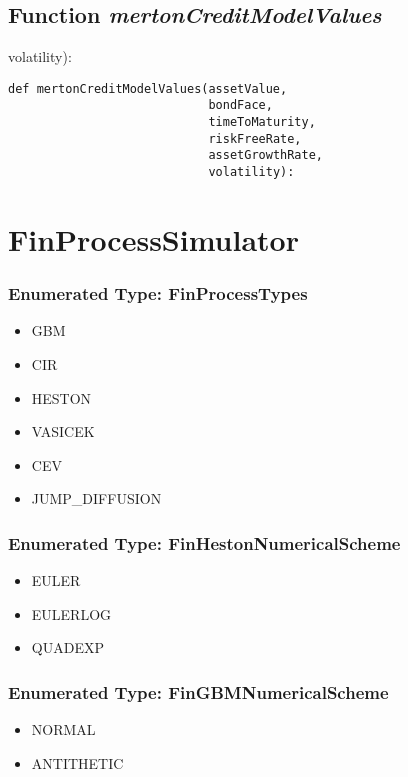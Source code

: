 \documentclass[twoside,11pt]{book}
\begin{document}
\subsection{Function {\it mertonCreditModelValues}}
volatility):

\begin{lstlisting}
def mertonCreditModelValues(assetValue,
                            bondFace,
                            timeToMaturity,
                            riskFreeRate,
                            assetGrowthRate,
                            volatility):
\end{lstlisting}

\newpage
\section{FinProcessSimulator}

\subsubsection{Enumerated Type: FinProcessTypes}
\begin{itemize}
\item{GBM}
\item{CIR}
\item{HESTON}
\item{VASICEK}
\item{CEV}
\item{JUMP\_DIFFUSION}
\end{itemize}

\subsubsection{Enumerated Type: FinHestonNumericalScheme}
\begin{itemize}
\item{EULER}
\item{EULERLOG}
\item{QUADEXP}
\end{itemize}

\subsubsection{Enumerated Type: FinGBMNumericalScheme}
\begin{itemize}
\item{NORMAL}
\item{ANTITHETIC}
\end{itemize}
\end{document}
